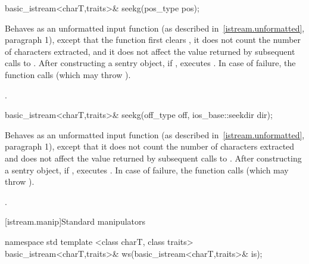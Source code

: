 %
%
\begin{itemdecl}
basic_istream<charT,traits>& seekg(pos_type pos);
\end{itemdecl}

\begin{itemdescr}
\pnum
\effects
Behaves as an unformatted input function (as described in~\ref{istream.unformatted}, paragraph 1), except that
the function first clears ,
it does not count
the number of characters extracted, and it does not affect the value
returned by subsequent calls to
.
After constructing a sentry object, if
,
executes
.
In case of failure, the function calls
(which may throw
).

\pnum
\returns
{}.
\end{itemdescr}

%
%
\begin{itemdecl}
basic_istream<charT,traits>& seekg(off_type off, ios_base::seekdir dir);
\end{itemdecl}

\begin{itemdescr}
\pnum
\effects
Behaves as an unformatted input function (as described in~\ref{istream.unformatted}, paragraph
1), except that it does not count
the number of characters extracted and does not affect the value
returned by subsequent calls to
.
After constructing a sentry object, if
,
executes
.
In case of failure, the function calls  (which may throw
).

\pnum
\returns
{}.
\end{itemdescr}

[istream.manip]{Standard  manipulators}

%
\begin{itemdecl}
namespace std {
  template <class charT, class traits>
    basic_istream<charT,traits>& ws(basic_istream<charT,traits>& is);
}
\end{itemdecl}

